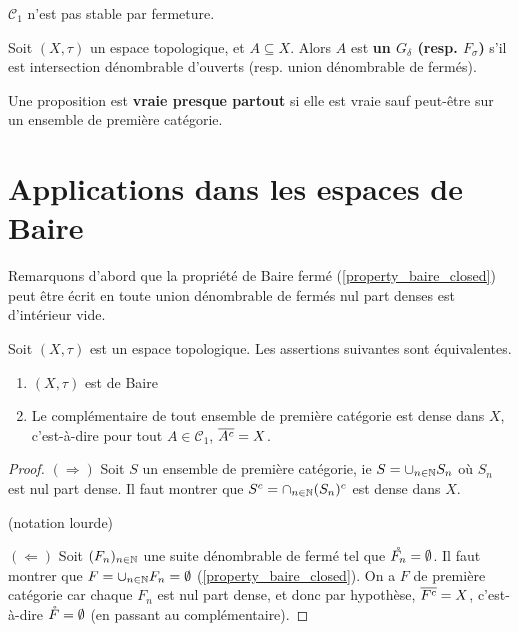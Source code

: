 \begin{remarque}
	$\mathcal{C}_{1}$ n'est pas stable par fermeture.
\end{remarque}

\begin{definition} 
	Soit $(X, \tau)$ un espace topologique, et $A \subseteq X$.
	Alors $A$ est \textbf{un $G_{\delta}$ (resp. $F_{\sigma}$)} s'il est intersection
	dénombrable d'ouverts (resp. union dénombrable de fermés).
\end{definition}

\begin{definition} 
	Une proposition est \textbf{vraie presque partout} si elle est vraie sauf
	peut-être sur un ensemble de première catégorie.
\end{definition}

\section{Applications dans les espaces de Baire}

Remarquons d'abord que la propriété de Baire fermé
(\ref{property_baire_closed}) peut être écrit en toute union dénombrable
de fermés nul part denses est d'intérieur vide.

\begin{proposition}
	\label{proposition_first_set_category_equiv_baire}
	Soit $(X, \tau)$ est un espace topologique. Les assertions suivantes sont
	équivalentes.
	\begin{enumerate}
		\item $(X, \tau)$ est de Baire
		\item Le complémentaire de tout ensemble de première catégorie est dense
			dans $X$, c'est-à-dire pour tout $A \in \mathcal{C}_{1}$, $\overline{A^{c}} = X$.
	\end{enumerate}
\end{proposition}

\ifdefined\outputproof
\begin{proof}
	$(\Rightarrow)$
	Soit $S$ un ensemble de première catégorie, ie $S = \cup_{n \in \mathbb{N}}
	S_{n}$ où $S_{n}$ est nul part dense. Il faut montrer que $S^{c} =
	\cap_{n \in \mathbb{N}} (S_{n})^{c}$ est dense dans $X$.

	(notation lourde)

	$(\Leftarrow)$
	Soit $(F_{n})_{n \in \mathbb{N}}$ une suite dénombrable de fermé tel que
	$\mathring{F_{n}} = \emptyset$.
	Il faut montrer que $F = \cup_{n \in \mathbb{N}} F_{n} = \emptyset$
	(\ref{property_baire_closed}).
	On a $F$ de première catégorie car chaque $F_{n}$ est nul part dense, et
	donc par hypothèse, $\overline{F^{c}} = X$, c'est-à-dire $\mathring{F} =
	\emptyset$ (en passant au complémentaire).
\end{proof}
\fi

